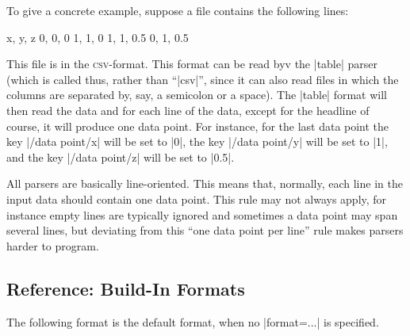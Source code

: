 To give a concrete example, suppose a file contains the following
lines:
%
\begin{codeexample}
x, y, z
0, 0, 0
1, 1, 0
1, 1, 0.5
0, 1, 0.5
\end{codeexample}
%
This file is in the \textsc{csv}-format. This format can be read byv the
|table| parser (which is called thus, rather than ``|csv|'', since it can also
read files in which the columns are separated by, say, a semicolon or a space).
The |table| format will then read the data and for each line of the data,
except for the headline of course, it will produce one data point. For
instance, for the last data point the key |/data point/x| will be set to |0|,
the key |/data point/y| will be set to |1|, and the key |/data point/z| will be
set to |0.5|.

All parsers are basically line-oriented. This means that, normally, each line
in the input data should contain one data point. This rule may not always
apply, for instance empty lines are typically ignored and sometimes a data
point may span several lines, but deviating from this ``one data point per
line'' rule makes parsers harder to program.


\subsection{Reference: Build-In Formats}

The following format is the default format, when no |format=...| is specified.

